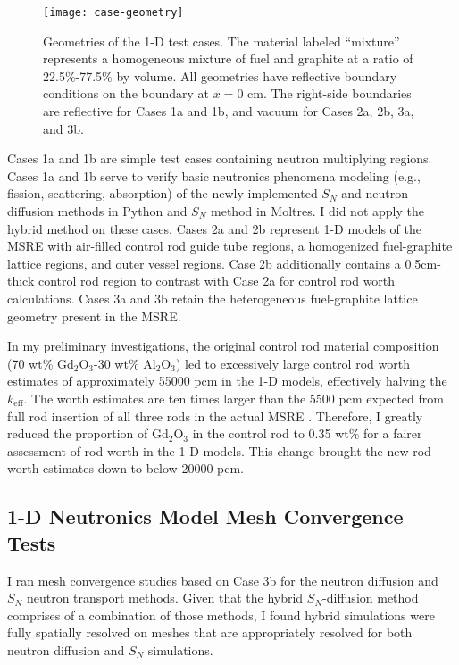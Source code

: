 \begin{figure}[htb!]
  \centering
  \texttt{[image: case-geometry]}
  \caption{Geometries of the 1-D test cases. The material labeled ``mixture'' represents a
    homogeneous mixture of fuel and graphite at a ratio of 22.5\%-77.5\% by volume. All geometries
    have reflective boundary conditions on the boundary at $x=0$ cm. The right-side boundaries are
    reflective for Cases 1a and 1b, and vacuum for Cases 2a, 2b, 3a, and 3b.}
  \label{fig:case-geom}
\end{figure}

Cases 1a and 1b are simple test cases containing neutron multiplying regions. Cases 1a and 1b serve
to verify basic neutronics phenomena modeling (e.g., fission, scattering, absorption) of the newly
implemented $S_N$ and neutron diffusion methods in Python and $S_N$ method in Moltres. I did not
apply the hybrid method on these cases. Cases 2a and 2b represent 1-D models of the \gls{MSRE} with
air-filled control rod guide tube regions, a homogenized fuel-graphite lattice regions, and outer
vessel regions. Case 2b additionally contains a 0.5cm-thick control rod region to contrast with
Case 2a for control rod worth calculations. Cases 3a and 3b retain the heterogeneous fuel-graphite
lattice geometry present in the \gls{MSRE}.

In my preliminary investigations, the original control rod material composition
(70 wt\% Gd$_2$O$_3$-30 wt\% Al$_2$O$_3$) led to excessively large control rod worth estimates of
approximately 55000 pcm in the 1-D models, effectively halving the $k_\text{eff}$. The worth
estimates are ten times larger
than the 5500 pcm expected from full rod insertion of all three rods in the actual \gls{MSRE}
\cite{fratoni_molten_2020}. Therefore, I greatly reduced the proportion of Gd$_2$O$_3$ in the
control rod to 0.35 wt\% for a fairer assessment of rod worth in the 1-D models. This change
brought the new rod worth estimates down to below 20000 pcm.

\subsection{1-D Neutronics Model Mesh Convergence Tests}

I ran mesh convergence studies based on Case 3b for the neutron diffusion and $S_N$ neutron
transport methods. Given that the hybrid $S_N$-diffusion method comprises of a combination of those
methods, I found hybrid simulations were fully spatially resolved on meshes that are
appropriately resolved for both neutron diffusion and $S_N$ simulations.

